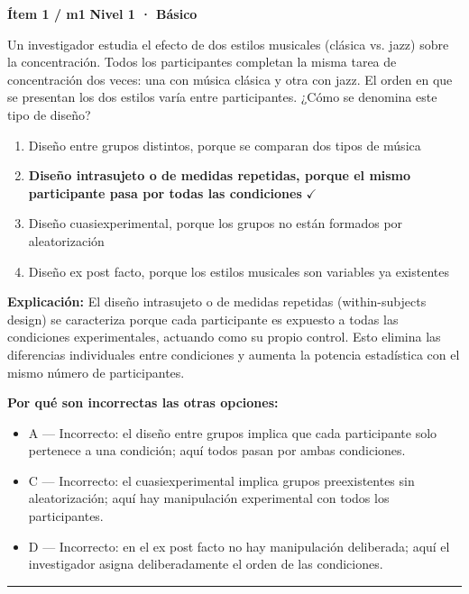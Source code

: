 \documentclass[12pt,a4paper]{article}
\begin{document}
\begin{mdframed}[backgroundcolor=fondogris,linecolor=azul,linewidth=1pt,innerleftmargin=10pt,innerrightmargin=10pt,innertopmargin=7pt,innerbottommargin=7pt]
\textbf{Ítem 1 / m1} \hfill {\small\bfseries\color{azul} Nivel 1 · Básico}
\end{mdframed}

Un investigador estudia el efecto de dos estilos musicales (clásica vs. jazz) sobre la concentración. Todos los participantes completan la misma tarea de concentración dos veces: una con música clásica y otra con jazz. El orden en que se presentan los dos estilos varía entre participantes. ¿Cómo se denomina este tipo de diseño?

\begin{enumerate}
  \item[A.] Diseño entre grupos distintos, porque se comparan dos tipos de música
  \item[\textbf{\color{verde}B.}] \textbf{\color{verde} Diseño intrasujeto o de medidas repetidas, porque el mismo participante pasa por todas las condiciones} \hfill $\checkmark$
  \item[C.] Diseño cuasiexperimental, porque los grupos no están formados por aleatorización
  \item[D.] Diseño ex post facto, porque los estilos musicales son variables ya existentes
\end{enumerate}

\noindent\textbf{\color{azul}Explicación:} El diseño intrasujeto o de medidas repetidas (within-subjects design) se caracteriza porque cada participante es expuesto a todas las condiciones experimentales, actuando como su propio control. Esto elimina las diferencias individuales entre condiciones y aumenta la potencia estadística con el mismo número de participantes.

\noindent\textbf{\color{gris}Por qué son incorrectas las otras opciones:}
\begin{itemize}
  \item {\small A — Incorrecto: el diseño entre grupos implica que cada participante solo pertenece a una condición; aquí todos pasan por ambas condiciones.}
  \item {\small C — Incorrecto: el cuasiexperimental implica grupos preexistentes sin aleatorización; aquí hay manipulación experimental con todos los participantes.}
  \item {\small D — Incorrecto: en el ex post facto no hay manipulación deliberada; aquí el investigador asigna deliberadamente el orden de las condiciones.}
\end{itemize}
\vspace{8pt}\hrule\vspace{10pt}
\end{document}

